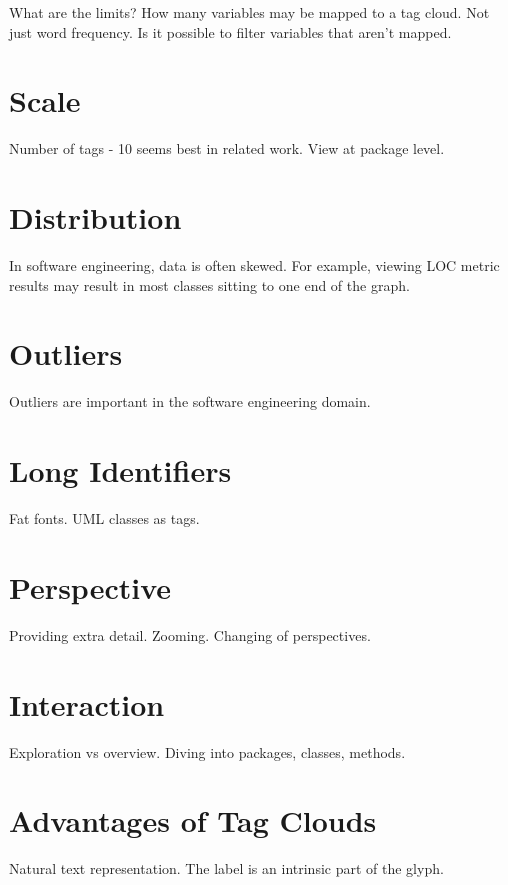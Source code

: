 What are the limits? How many variables may be mapped to a tag cloud. Not just word frequency. Is it possible to filter variables that aren't mapped.


\section{Scale}

Number of tags - 10 seems best in related work. View at package level.

\section{Distribution}

In software engineering, data is often skewed. For example, viewing LOC metric results may result in most classes sitting to one end of the graph. 

\section{Outliers}

Outliers are important in the software engineering domain.

\section{Long Identifiers}

Fat fonts. UML classes as tags.

\section{Perspective}

Providing extra detail. Zooming. Changing of perspectives.

\section{Interaction}

Exploration vs overview.  Diving into packages, classes, methods.

\section{Advantages of Tag Clouds}

Natural text representation. The label is an intrinsic part of the glyph.



